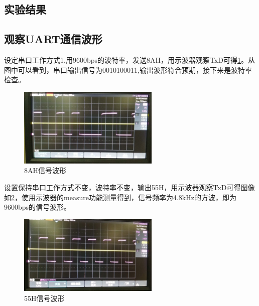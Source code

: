 \documentclass{article}
\begin{document}
\begin{CJK}{UTF8}{gkai}
\section{实验结果}
\subsection{观察UART通信波形}
设定串口工作方式1,用9600bps的波特率，发送8AH，用示波器观察TxD可得\ref{pro1_1}。从图中可以看到，串口输出信号为0010100011,输出波形符合预期，接下来是波特率检查。
\begin{figure}
  \centering
  \includegraphics[width=0.6\textwidth]{code.jpg}
  \caption{8AH信号波形}
  \label{pro1_1}
\end{figure}
设置保持串口工作方式不变，波特率不变，输出55H，用示波器观察TxD可得图像如\ref{pro1_2}，使用示波器的measure功能测量得到，信号频率为4.8kHz的方波，即为9600bps的信号波形。
\begin{figure}
  \centering
  \includegraphics[width=0.6\textwidth]{frequency.jpg}
  \caption{55H信号波形}
  \label{pro1_2}
\end{figure}

\end{CJK}
\end{document}
